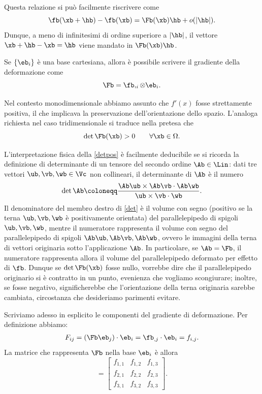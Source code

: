 Questa relazione si può facilmente riscrivere come
\begin{equation}
\fb(\xb+\hb)-\fb(\xb)=\Fb(\xb)\hb+o(|\hb|).
\end{equation}
Dunque, a meno di infinitesimi di ordine superiore a $|\hb|$, il vettore $\xb+\hb-\xb=\hb$ viene mandato in $\Fb(\xb)\hb$.

Se $\{\eb_i\}$ è una base cartesiana, allora è possibile scrivere il gradiente della deformazione come
\begin{equation}
	\Fb=\fb,_{i}\otimes\eb_i.
\end{equation}

Nel contesto monodimensionale abbiamo assunto che  $f'(x)$ fosse strettamente positiva, il che implicava la preservazione dell'orientazione dello spazio. L'analoga richiesta nel caso tridimensionale si traduce nella pretesa che
\begin{equation}\label{detpos}
	\det \Fb(\xb)>0 \qquad\forall \xb\in\Omega.
\end{equation}

L'interpretazione fisica della \eqref{detpos} è facilmente deducibile se si ricorda la definizione di determinante di un tensore del secondo ordine $\Ab\in\Lin$: dati tre vettori $\ub, \vb,\wb\in \Vc$ non collineari, il determinante di $\Ab$ è il numero 
\begin{equation}\label{det}
	\det \Ab\coloneqq \frac{\Ab\ub\times\Ab\vb\cdot\Ab\wb}{\ub\times\vb\cdot\wb}.
\end{equation}
Il denominatore del membro destro di \eqref{det} è il volume con segno (positivo se la terna $\ub, \vb,\wb$ è positivamente orientata) del parallelepipedo di spigoli  $\ub, \vb,\wb$, mentre il numeratore  rappresenta il volume con segno del parallelepipedo di spigoli $\Ab\ub, \Ab\vb,\Ab\wb$, ovvero le immagini della terna di vettori originaria sotto l'applicazione $\Ab$. In particolare, se $\Ab=\Fb$, il numeratore rappresenta allora il volume del parallelepipedo deformato per effetto di $\fb$. Dunque se $\det \Fb(\xb)$ fosse nullo, vorrebbe dire che il parallelepipedo originario si è contratto in un punto, evenienza che vogliamo scongiurare; inoltre, se fosse negativo, significherebbe che l'orientazione della terna originaria sarebbe cambiata, circostanza che desideriamo parimenti evitare.

Scriviamo adesso in esplicito le componenti del gradiente di deformazione. Per definizione abbiamo:
\begin{equation}
	\begin{aligned}
	F_{ij}=(\Fb\eb_j)\cdot \eb_i=\fb_{,j}\cdot \eb_i=f_{i,j}.
	\end{aligned}
\end{equation}
La matrice che rappresenta $\Fb$ nella base ${\eb_i}$ è allora
\begin{equation}
[\Fb]=
\begin{bmatrix}
	f_{1,1}&f_{1,2}&f_{1,3}\\f_{2,1}&f_{2,2}&f_{2,3}\\f_{3,1}&f_{3,2}&f_{3,3}
\end{bmatrix}.
\end{equation}

